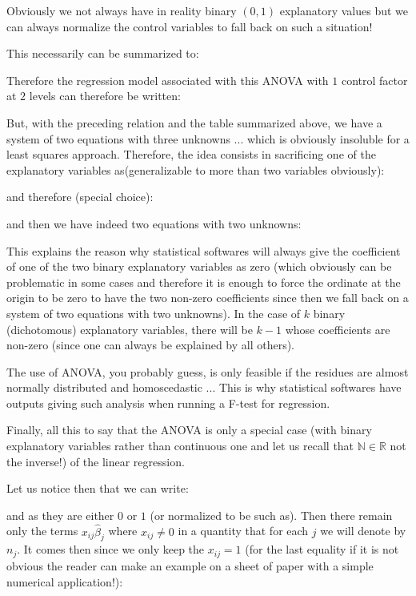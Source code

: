 	Obviously we not always have in reality binary $(0,1)$ explanatory values but we can always normalize the control variables to fall back on such a situation!
	
	This necessarily can be summarized to:
	
	Therefore the regression model associated with this ANOVA with $1$ control factor at $2$ levels can therefore be written:
	
	But, with the preceding relation and the table summarized above, we have a system of two equations with three unknowns ... which is obviously insoluble for a least squares approach. Therefore, the idea consists in sacrificing one of the explanatory variables as(generalizable to more than two variables obviously):
	
	and therefore (special choice):
	
	and then we have indeed two equations with two unknowns:
	
	This explains the reason why statistical softwares will always give the coefficient of one of the two binary explanatory variables as zero (which obviously can be problematic in some cases and therefore it is enough to force the ordinate at the origin to be zero to have the two non-zero coefficients since then we fall back on a system of two equations with two unknowns). In the case of $k$ binary (dichotomous) explanatory variables, there will be $k - 1$ whose coefficients are non-zero (since one can always be explained by all others).
	\begin{tcolorbox}[title=Remark,colframe=black,arc=10pt]
	The use of ANOVA, you probably guess, is only feasible if the residues are almost normally distributed and homoscedastic ... This is why statistical softwares have outputs giving such analysis when running a F-test for regression. 
	\end{tcolorbox}
	Finally, all this to say that the ANOVA is only a special case (with binary explanatory variables rather than continuous one and let us recall that $\mathbb{N}\in\mathbb{R}$ not the inverse!) of the linear regression.

	Let us notice then that we can write:
	
	and as they are either $0$ or $1$ (or normalized to be such as). Then there remain only the terms $x_{ij}\hat{\beta}_j$ where $x_{ij}\neq 0$ in a quantity that for each $j$ we will denote by $n_j$. It comes then since we only keep the $x_{ij}=1$ (for the last equality if it is not obvious the reader can make an example on a sheet of paper with a simple numerical application!):
	
